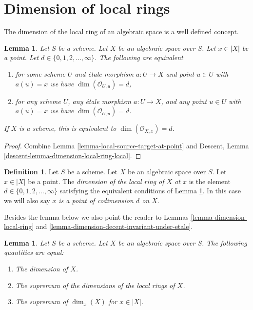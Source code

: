 \documentclass{stacks-project}
\theoremstyle{plain}
\newtheorem{lemma}[subsection]{Lemma}
\theoremstyle{definition}
\newtheorem{definition}[subsection]{Definition}
\theoremstyle{remark}
\numberwithin{equation}{subsection}
\begin{document}
\section{Dimension of local rings}
\label{section-dimension-local-ring}

\noindent
The dimension of the local ring of an algebraic space is a well defined
concept.

\begin{lemma}
\label{lemma-pre-dimension-local-ring}
Let $S$ be a scheme.
Let $X$ be an algebraic space over $S$.
Let $x \in |X|$ be a point.
Let $d \in \{0, 1, 2, \ldots, \infty\}$.
The following are equivalent
\begin{enumerate}
\item for some scheme $U$ and \'etale morphism $a : U \to X$ and point
$u \in U$ with $a(u) = x$ we have $\dim(\mathcal{O}_{U, u}) = d$,
\item for any scheme $U$, any \'etale morphism $a : U \to X$, and any point
$u \in U$ with $a(u) = x$ we have $\dim(\mathcal{O}_{U, u}) = d$.
\end{enumerate}
If $X$ is a scheme, this is equivalent to $\dim(\mathcal{O}_{X, x}) = d$.
\end{lemma}

\begin{proof}
Combine
Lemma \ref{lemma-local-source-target-at-point} and
Descent, Lemma \ref{descent-lemma-dimension-local-ring-local}.
\end{proof}

\begin{definition}
\label{definition-dimension-local-ring}
Let $S$ be a scheme. Let $X$ be an algebraic space over $S$. Let $x \in |X|$
be a point. The {\it dimension of the local ring of $X$ at $x$} is
the element $d \in \{0, 1, 2, \ldots, \infty\}$ satisfying the equivalent
conditions of Lemma \ref{lemma-pre-dimension-local-ring}. In this case we
will also say {\it $x$ is a point of codimension $d$ on $X$}.
\end{definition}

\noindent
Besides the lemma below we also point the reader to
Lemmas \ref{lemma-dimension-local-ring} and
\ref{lemma-dimension-decent-invariant-under-etale}.

\begin{lemma}
\label{lemma-dimension}
Let $S$ be a scheme. Let $X$ be an algebraic space over $S$.
The following quantities are equal:
\begin{enumerate}
\item The dimension of $X$.
\item The supremum of the dimensions of the local rings of $X$.
\item The supremum of $\dim_x(X)$ for $x \in |X|$.
\end{enumerate}
\end{lemma}
\end{document}
